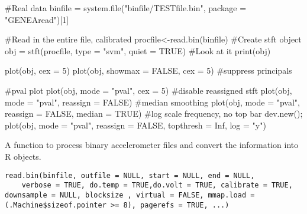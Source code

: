 \documentclass[a4paper]{book}
\begin{document}
\begin{Examples}
\begin{ExampleCode}

#Real data
binfile  = system.file("binfile/TESTfile.bin", package = "GENEAread")[1]

#Read in the entire file, calibrated
procfile<-read.bin(binfile)
#Create stft object
obj = stft(procfile, type = "svm", quiet = TRUE)
#Look at it
print(obj)

plot(obj, cex = 5)
plot(obj, showmax = FALSE, cex = 5) #suppress principals

#pval plot
plot(obj, mode = "pval", cex = 5)
#disable reassigned stft
plot(obj, mode = "pval", reassign = FALSE) 
#median smoothing
plot(obj, mode = "pval", reassign = FALSE, median = TRUE) 
#log scale frequency, no top bar
dev.new(); plot(obj, mode = "pval", reassign = FALSE, topthresh = Inf, log = "y") 
\end{ExampleCode}
\end{Examples}
%
\begin{Description}\relax
A function to process binary accelerometer files and convert the information into R objects.
\end{Description}
%
\begin{Usage}
\begin{verbatim}
read.bin(binfile, outfile = NULL, start = NULL, end = NULL, 
    verbose = TRUE, do.temp = TRUE,do.volt = TRUE, calibrate = TRUE, downsample = NULL, blocksize , virtual = FALSE, mmap.load = (.Machine$sizeof.pointer >= 8), pagerefs = TRUE, ...)
\end{verbatim}
\end{Usage}
%
\end{document}
